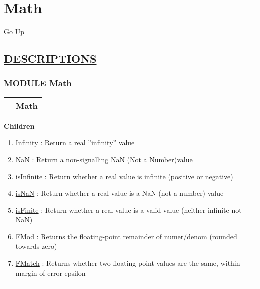 \chapter*{\color{headfile}
Math
}
\hypertarget{ecldoc:toc:Math}{}
\hyperlink{ecldoc:toc:root}{Go Up}


\section*{\underline{\textsf{DESCRIPTIONS}}}
\subsection*{\textsf{\colorbox{headtoc}{\color{white} MODULE}
Math}}

\hypertarget{ecldoc:Math}{}

{\renewcommand{\arraystretch}{1.5}
\begin{tabularx}{\textwidth}{|>{\raggedright\arraybackslash}l|X|}
\hline
\hspace{0pt}\mytexttt{\color{red} } & \textbf{Math} \\
\hline
\end{tabularx}
}

\par


\textbf{Children}
\begin{enumerate}
\item \hyperlink{ecldoc:math.infinity}{Infinity}
: Return a real ''infinity'' value
\item \hyperlink{ecldoc:math.nan}{NaN}
: Return a non-signalling NaN (Not a Number)value
\item \hyperlink{ecldoc:math.isinfinite}{isInfinite}
: Return whether a real value is infinite (positive or negative)
\item \hyperlink{ecldoc:math.isnan}{isNaN}
: Return whether a real value is a NaN (not a number) value
\item \hyperlink{ecldoc:math.isfinite}{isFinite}
: Return whether a real value is a valid value (neither infinite not NaN)
\item \hyperlink{ecldoc:math.fmod}{FMod}
: Returns the floating-point remainder of numer/denom (rounded towards zero)
\item \hyperlink{ecldoc:math.fmatch}{FMatch}
: Returns whether two floating point values are the same, within margin of error epsilon
\end{enumerate}

\rule{\linewidth}{0.5pt}

